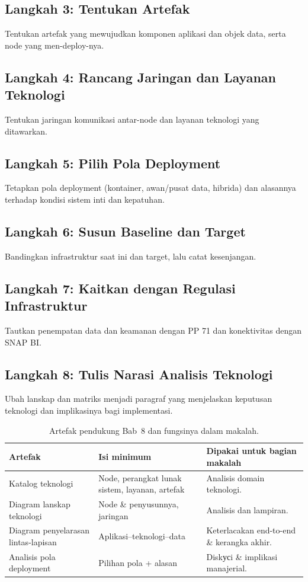 \subsection{Langkah 3: Tentukan Artefak}
Tentukan artefak yang mewujudkan komponen aplikasi dan objek data, serta node
yang men-deploy-nya.

\subsection{Langkah 4: Rancang Jaringan dan Layanan Teknologi}
Tentukan jaringan komunikasi antar-node dan layanan teknologi yang ditawarkan.

\subsection{Langkah 5: Pilih Pola Deployment}
Tetapkan pola deployment (kontainer, awan/pusat data, hibrida) dan alasannya
terhadap kondisi sistem inti dan kepatuhan.

\subsection{Langkah 6: Susun Baseline dan Target}
Bandingkan infrastruktur saat ini dan target, lalu catat kesenjangan.

\subsection{Langkah 7: Kaitkan dengan Regulasi Infrastruktur}
Tautkan penempatan data dan keamanan dengan PP 71 dan konektivitas dengan SNAP BI.

\subsection{Langkah 8: Tulis Narasi Analisis Teknologi}
Ubah lanskap dan matriks menjadi paragraf yang menjelaskan keputusan teknologi dan
implikasinya bagi implementasi.

\begin{table}[htbp]
\centering
\scriptsize
\caption{Artefak pendukung Bab~8 dan fungsinya dalam makalah.}
\label{tab:artefak-bab7-tech}
\begin{tabularx}{\textwidth}{@{}p{} p{} X@{}}
\hline
\textbf{Artefak} & \textbf{Isi minimum} & \textbf{Dipakai untuk bagian makalah} \\
\hline
Katalog teknologi & Node, perangkat lunak sistem, layanan, artefak & Analisis
domain teknologi. \\
Diagram lanskap teknologi & Node \& penyusunnya, jaringan & Analisis dan lampiran. \\
Diagram penyelarasan lintas-lapisan & Aplikasi--teknologi--data & Keterlacakan
end-to-end \& kerangka akhir. \\
Analisis pola deployment & Pilihan pola + alasan & Diskусi \& implikasi
manajerial. \\
\hline
\end{tabularx}
\end{table}

